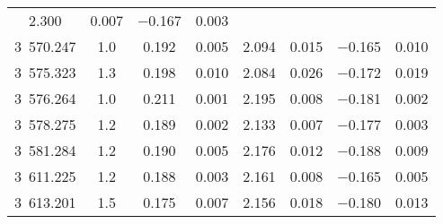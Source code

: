 \begin{table}
\begin{tabular}{cccccccc}
2.300 & 0.007 & $-$0.167 & 0.003 \\ 3~570.247 & 1.0 & 0.192 & 0.005 & 2.094 & 0.015 & $-$0.165 & 0.010 \\ 3~575.323 & 1.3 & 0.198 & 0.010 & 2.084 & 0.026 & $-$0.172 & 0.019 \\ 3~576.264 & 1.0 & 0.211 & 0.001 & 2.195 & 0.008 & $-$0.181 & 0.002 \\ 3~578.275 & 1.2 & 0.189 & 0.002 & 2.133 & 0.007 & $-$0.177 & 0.003 \\ 3~581.284 & 1.2 & 0.190 & 0.005 & 2.176 & 0.012 & $-$0.188 & 0.009 \\ 3~611.225 & 1.2 & 0.188 & 0.003 & 2.161 & 0.008 & $-$0.165 & 0.005 \\ 3~613.201 & 1.5 & 0.175 & 0.007 & 2.156 & 0.018 & $-$0.180 & 0.013 \\ \hline 
\end{tabular} 
\end{table} 